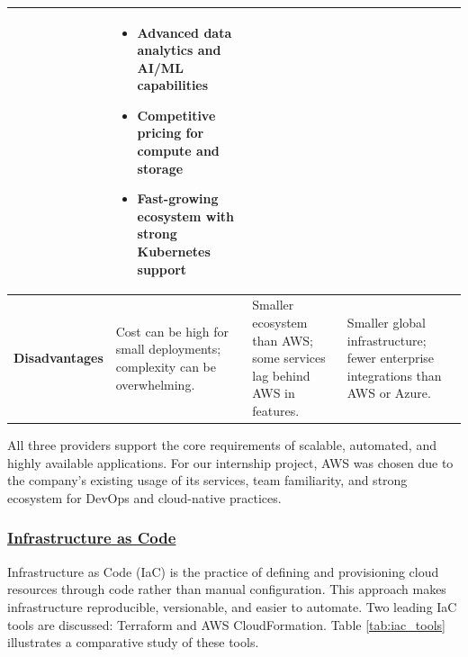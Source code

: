 \begin{table}[H]
\begin{tabularx}{\textwidth} {
            | >{\centering\arraybackslash}p{2cm}
            | >{\justifying\arraybackslash}X
            | >{\justifying\arraybackslash}X
            | >{\justifying\arraybackslash}X |}
\begin{itemize}[leftmargin=*, topsep=0pt, itemsep=1pt, parsep=2pt]
        \end{itemize} & \begin{itemize}[leftmargin=*, topsep=0pt, itemsep=1pt, parsep=2pt]
            \item Advanced data analytics and AI/ML capabilities
            \item Competitive pricing for compute and storage
            \item Fast-growing ecosystem with strong Kubernetes support
        \end{itemize} \\
        \hline
        \textbf{Disadvantages} & Cost can be high for small deployments; complexity can be overwhelming. & Smaller ecosystem than AWS; some services lag behind AWS in features. & Smaller global infrastructure; fewer enterprise integrations than AWS or Azure. \\
        \hline
    \end{tabularx}
\end{table}

All three providers support the core requirements of scalable, automated,
and highly available applications. For our internship project, AWS was chosen
due to the company’s existing usage of its services, team familiarity, and
strong ecosystem for DevOps and cloud-native practices.

\subsubsection*{\underline{Infrastructure as Code}}
Infrastructure as Code (IaC) is the practice of defining and provisioning cloud 
resources through code rather than manual configuration. This approach makes 
infrastructure reproducible, versionable, and easier to automate. Two leading 
IaC tools are discussed: Terraform and AWS CloudFormation. Table \ref{tab:iac_tools} 
illustrates a comparative study of these tools.

